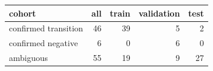 \begin{tabular}{lrrrr}
\toprule
cohort & all & train & validation & test \\
\midrule
confirmed transition & 46 & 39 & 5 & 2 \\
confirmed negative & 6 & 0 & 6 & 0 \\
ambiguous & 55 & 19 & 9 & 27 \\
\bottomrule
\end{tabular}